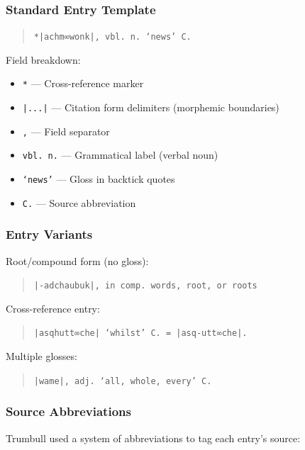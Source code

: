 \subsubsection{Standard Entry Template}

\begin{quote}
\texttt{*|achm∞wonk|, vbl. n. `news'    C.}
\end{quote}

Field breakdown:
\begin{itemize}
  \item \texttt{*} --- Cross-reference marker
  \item \texttt{|...|} --- Citation form delimiters (morphemic boundaries)
  \item \texttt{,} --- Field separator
  \item \texttt{vbl. n.} --- Grammatical label (verbal noun)
  \item \texttt{`news'} --- Gloss in backtick quotes
  \item \texttt{C.} --- Source abbreviation
\end{itemize}

\subsubsection{Entry Variants}

Root/compound form (no gloss):
\begin{quote}
\texttt{|-adchaubuk|, in comp. words, root, or roots}
\end{quote}

Cross-reference entry:
\begin{quote}
\texttt{|asqhutt∞che| `whilst'    C. = |asq-utt∞che|.}
\end{quote}

Multiple glosses:
\begin{quote}
\texttt{|wame|, adj. `all, whole, every'    C.}
\end{quote}

\subsubsection{Source Abbreviations}

Trumbull used a system of abbreviations to tag each entry's source:

